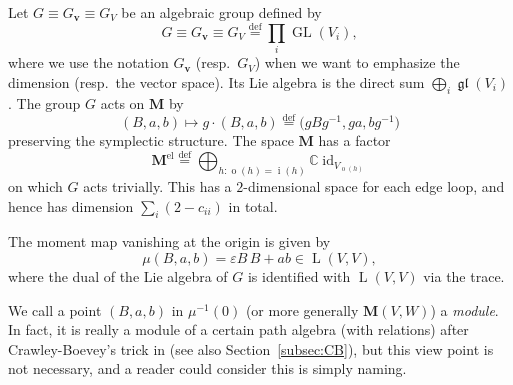 \documentclass[11pt]{article}
\theoremstyle{definition}
\numberwithin{equation}{section}
\newcommand{\subsecref}[1]{Section~\ref{#1}}
\newcommand{\defeq}{\overset{\operatorname{\scriptstyle def}}{=}}
\newcommand{\C}{{\mathbb C}}
\newcommand{\GL}{\operatorname{GL}}
\newcommand{\gl}{\operatorname{\mathfrak{gl}}}
\newcommand{\id}{\operatorname{id}}
\newcommand{\vin}[1]{\operatorname{i}(#1)} %
\newcommand{\vout}[1]{\operatorname{o}(#1)} %
\newcommand{\bM}{{\mathbf M}} %
\newcommand{\bv}{{\mathbf v}} %
\newcommand{\HomL}{\operatorname{L}}
\begin{document}
Let $G \equiv G_\bv \equiv G_V$ be an algebraic group def\/ined by
\begin{equation*}
   G \equiv G_\bv \equiv G_V \defeq \prod_i \GL(V_i),
\end{equation*}
where we use the notation $G_\bv$ (resp.\ $G_V$) when we want to
emphasize the dimension (resp.\ the vector space). Its Lie algebra is
the direct sum $\bigoplus_i \gl(V_i)$.
%
The group $G$ acts on $\bM$ by
\begin{equation*}\label{eq:Kaction}
  (B,a,b) \mapsto g\cdot (B,a,b)
  \defeq \big(g B g^{-1}, ga, bg^{-1}\big)
\end{equation*}
preserving the symplectic structure. The space $\bM$ has a factor
\begin{equation}\label{eq:trivial}
   \bM^{\text{el}}\defeq
   \bigoplus_{h : \vout{h} = \vin{h}} \C \id_{V_{\vout{h}}}
\end{equation}
on which $G$ acts trivially. This has a $2$-dimensional space for each
edge loop, and hence has dimension $\sum_i (2 - c_{ii})$ in total.

The moment map vanishing at the origin is given by
\begin{equation}
  \mu(B, a, b) = \varepsilon B\, B + ab \in \HomL(V, V),
\end{equation}
where the dual of the Lie algebra of $G$ is identif\/ied with
$\HomL(V, V)$ via the trace.

We call a point $(B,a,b)$ in $\mu^{-1}(0)$ (or more generally
$\bM(V,W)$) a {\it module}. In fact, it is really a module of a
certain path algebra (with relations) after Crawley-Boevey's trick in
\cite[{the end of Introduction}]{CB} (see also \subsecref{subsec:CB}),
but this view point is not necessary, and a reader could consider this
is simply naming.
\end{document}
